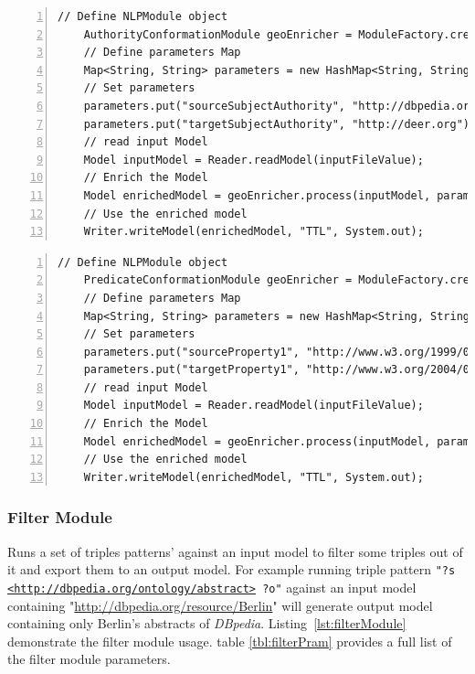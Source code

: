 \documentclass[a4paper,twoside,bibtotoc,abstracton,12pt,BCOR=15mm]{article}
\begin{document}
    \begin{lstlisting}[label=lst:aConf, float=tp, numbers=left, numberstyle=\tiny, caption = Code fragment to call the \texttt{AuthorityConformationModule} class.]
    // Define NLPModule object
    AuthorityConformationModule geoEnricher = ModuleFactory.createModule("authorityconformation");
    // Define parameters Map
    Map<String, String> parameters = new HashMap<String, String>();
    // Set parameters
    parameters.put("sourceSubjectAuthority", "http://dbpedia.org");
    parameters.put("targetSubjectAuthority", "http://deer.org");
    // read input Model
    Model inputModel = Reader.readModel(inputFileValue);
    // Enrich the Model
    Model enrichedModel = geoEnricher.process(inputModel, parameters);
    // Use the enriched model
    Writer.writeModel(enrichedModel, "TTL", System.out);
    \end{lstlisting}
    
        \begin{lstlisting}[label=lst:pConf, float=tp, numbers=left, numberstyle=\tiny, caption = Code fragment to call the \texttt{PredicateConformationModule} class.]
    // Define NLPModule object
    PredicateConformationModule geoEnricher = ModuleFactory.createModule("predicateconformation");
    // Define parameters Map
    Map<String, String> parameters = new HashMap<String, String>();
    // Set parameters
    parameters.put("sourceProperty1", "http://www.w3.org/1999/02/22-rdf-syntax-ns#label");
    parameters.put("targetProperty1", "http://www.w3.org/2004/02/skos/core#prefLabel");
    // read input Model
    Model inputModel = Reader.readModel(inputFileValue);
    // Enrich the Model
    Model enrichedModel = geoEnricher.process(inputModel, parameters);
    // Use the enriched model
    Writer.writeModel(enrichedModel, "TTL", System.out);
    \end{lstlisting}

\subsubsection{Filter Module}
    Runs a set of triples patterns' against an input model to filter some triples out of it and export them to an output model. 
    For example running triple pattern \texttt{"?s \url{<http://dbpedia.org/ontology/abstract>} ?o"} against an input model containing "\url{http://dbpedia.org/resource/Berlin}" will generate output model containing only Berlin's abstracts of \emph{DBpedia}.
    Listing~\ref{lst:filterModule} demonstrate the filter module usage.
    table \ref{tbl:filterPram} provides a full list of the filter module parameters.
\end{document}
